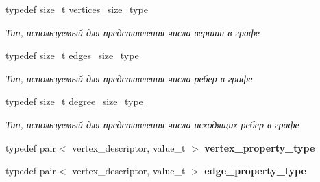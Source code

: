 \begin{DoxyCompactItemize}
\mbox{\label{class_s_p_u___g_r_a_p_h_1_1_spu_ultra_graph_af8312efee580452b40e3750d8acf3b08}} 
typedef size\+\_\+t \hyperlink{class_s_p_u___g_r_a_p_h_1_1_spu_ultra_graph_af8312efee580452b40e3750d8acf3b08}{vertices\+\_\+size\+\_\+type}
\begin{DoxyCompactList}\small\item\em Тип, используемый для представления числа вершин в графе \end{DoxyCompactList}\item 
\mbox{\label{class_s_p_u___g_r_a_p_h_1_1_spu_ultra_graph_a82496f8d87c7dfab766f15a989a05aa4}} 
typedef size\+\_\+t \hyperlink{class_s_p_u___g_r_a_p_h_1_1_spu_ultra_graph_a82496f8d87c7dfab766f15a989a05aa4}{edges\+\_\+size\+\_\+type}
\begin{DoxyCompactList}\small\item\em Тип, используемый для представления числа ребер в графе \end{DoxyCompactList}\item 
\mbox{\label{class_s_p_u___g_r_a_p_h_1_1_spu_ultra_graph_a0f24316ee9d0c5ea1b136cf4cf18c926}} 
typedef size\+\_\+t \hyperlink{class_s_p_u___g_r_a_p_h_1_1_spu_ultra_graph_a0f24316ee9d0c5ea1b136cf4cf18c926}{degree\+\_\+size\+\_\+type}
\begin{DoxyCompactList}\small\item\em Тип, используемый для представления числа исходящих ребер в графе \end{DoxyCompactList}\item 
\mbox{\label{class_s_p_u___g_r_a_p_h_1_1_spu_ultra_graph_a29b134691c15bbb48d3c213fa1492d49}} 
typedef pair$<$ vertex\+\_\+descriptor, value\+\_\+t $>$ {\bfseries vertex\+\_\+property\+\_\+type}
\item 
\mbox{\label{class_s_p_u___g_r_a_p_h_1_1_spu_ultra_graph_a2947d1a0c4a1e9bbb75e878511664127}} 
typedef pair$<$ vertex\+\_\+descriptor, value\+\_\+t $>$ {\bfseries edge\+\_\+property\+\_\+type}
\item 
\mbox{\label{class_s_p_u___g_r_a_p_h_1_1_spu_ultra_graph_a06163cbc87b2e49334b4bcc46c7b0c89}} 

\end{DoxyCompactItemize}
